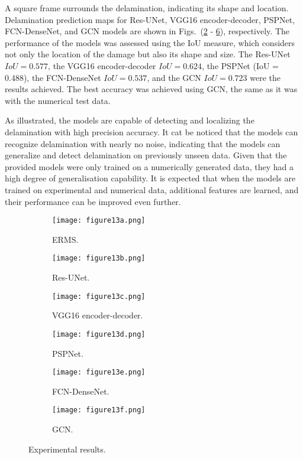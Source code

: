 A square frame surrounds the delamination, indicating its shape and location.
Delamination prediction maps for Res-UNet, VGG16 encoder-decoder, PSPNet, FCN-DenseNet, and GCN models are shown in Figs.~(\ref{fig:unet_exp_7_} - \ref{fig:gcn_exp}), respectively.
The performance of the models was assessed using the IoU measure, which considers not only the location of the damage but also its shape and size.
The Res-UNet \(IoU = 0.577\), the VGG16 encoder-decoder \(IoU = 0.624\), the PSPNet (IoU = 0.488), the FCN-DenseNet \(IoU = 0.537\), and the GCN \(IoU = 0.723\) were the results achieved.
The best accuracy was achieved using GCN, the same as it was with the numerical test data.

As illustrated, the models are capable of detecting and localizing the delamination with high precision accuracy.
It cat be noticed that the models can recognize delamination with nearly no noise, indicating that the models can generalize and detect delamination on previously unseen data.
Given that the provided models were only trained on a numerically generated data, they had a high degree of generalisation capability.
It is expected that when the models are trained on experimental and numerical data, additional features are learned, and their performance can be improved even further.
\begin{figure}[h!]
	\centering
	\begin{subfigure}[b]{0.47\textwidth}
		\centering
		\texttt{[image: figure13a.png]}
		\caption{ERMS.} %
		\label{fig:Delamination}	
	\end{subfigure}	
	\hfill
	\begin{subfigure}[b]{0.47\textwidth}
		\centering
		\texttt{[image: figure13b.png]}
		\caption{Res-UNet.} 
		\label{fig:unet_exp_7_}
	\end{subfigure}
	\hfill
	\begin{subfigure}[b]{0.47\textwidth}
		\centering
		\texttt{[image: figure13c.png]}
		\caption{VGG16 encoder-decoder.} 
		\label{fig:vgg16_exp_7_}
	\end{subfigure}
	\hfill
	\begin{subfigure}[b]{0.47\textwidth}
		\centering
		\texttt{[image: figure13d.png]}
		\caption{PSPNet.} 
		\label{fig:pspnet_exp_7_}
	\end{subfigure}
	\hfill
	\begin{subfigure}[b]{0.47\textwidth}
		\centering
		\texttt{[image: figure13e.png]}
		\caption{FCN-DenseNet.} 
		\label{fig:fcn_densenet_exp}
	\end{subfigure}
	\hfill
	\begin{subfigure}[b]{0.47\textwidth}
		\centering
		\texttt{[image: figure13f.png]}
		\caption{GCN.} 
		\label{fig:gcn_exp}
	\end{subfigure}
	\caption{Experimental results.}
	\label{fig:Exp_ERMS_teflon}
\end{figure}
\clearpage
